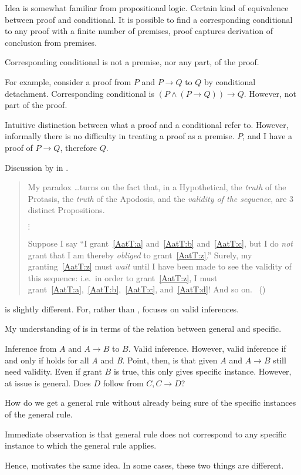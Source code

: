 \begin{note}
  Idea is somewhat familiar from propositional logic.
  Certain kind of equivalence between proof and conditional.
  It is possible to find a corresponding conditional to any proof with a finite number of premises, proof captures derivation of conclusion from premises.

  Corresponding conditional is not a premise, nor any part, of the proof.

  For example, consider a proof from \(P\) and \(P \rightarrow Q\) to \(Q\) by conditional detachment.
  Corresponding conditional is \((P \land (P \rightarrow Q)) \rightarrow Q\).
  However, not part of the proof.

  Intuitive distinction between what a proof and a conditional refer to.
  However, informally there is no difficulty in treating a proof as a premise.
  \(P\), and I have a proof of \(P \rightarrow Q\), therefore \(Q\).
\end{note}

\begin{note}
  Discussion by \citeauthor{Carroll:1895uj} in .

  \begin{quote}
    My paradox \dots turns on the fact that, in a Hypothetical, the \emph{truth} of the Protasis, the \emph{truth} of the Apodosis, and the \emph{validity of the sequence}, are 3 distinct Propositions.

    \mbox{}\hfill\(\vdots\)\hfill\mbox{}

    Suppose I say ``I grant~\ref{AatT:a} and~\ref{AatT:b} and~\ref{AatT:c}, but I do \emph{not} grant that I am thereby \emph{obliged} to grant~\ref{AatT:z}.''
    Surely, my granting~\ref{AatT:z} must \emph{wait} until I have been made to see the validity of this sequence: i.e.\ in order to grant~\ref{AatT:z}, I must grant~\ref{AatT:a},~\ref{AatT:b},~\ref{AatT:c}, and~\ref{AatT:d}! And so on.%
    \mbox{ }\hfill\mbox{(\citeyear[472]{Carroll:1977wl})}
  \end{quote}

  \citeauthor{Carroll:1895uj} is slightly different.
  For, rather than \ros{}, \citeauthor{Carroll:1895uj} focuses on valid inferences.

  My understanding of \citeauthor{Carroll:1895uj} is in terms of the relation between general and specific.

  Inference from \(A\) and \(A \rightarrow B\) to \(B\).
  Valid inference.
  However, valid inference if and only if holds for all \emph{A} and \emph{B}.
  Point, then, is that given \(A\) and \(A \rightarrow B\) still need validity.
  Even if grant \(B\) is true, this only gives specific instance.
  However, at issue is general.
  Does \(D\) follow from \(C, C \rightarrow D\)?

  How do we get a general rule without already being sure of the specific instances of the general rule.

  Immediate observation is that general rule does not correspond to any specific instance to which the general rule applies.

  Hence, motivates the same idea.
  In some cases, these two things are different.
\end{note}

